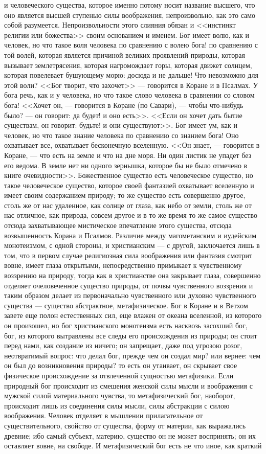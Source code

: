 \documentclass[12pt]{article}
\begin{document}
и человеческого существа, которое именно потому носит название высшего, что оно является высшей ступенью силы воображения, непроизвольно, как это само собой разумеется. Непроизвольности этого слияния обязан и <<инстинкт религии или божества>> своим основанием и именем. Бог имеет волю, как и человек, но что такое воля человека по сравнению с волею бога! по сравнению с той волей, которая является причиной великих проявлений природы, которая вызывает землетрясения, которая нагромождает горы, которая движет солнцем, которая повелевает бушующему морю: досюда и не дальше! Что невозможно для этой воли? <<Бог творит, что захочет>>  --- говорится в Коране и в Псалмах. У бога речь, как и у человека, но что такое слово человека в сравнении со словом бога! <<Хочет он, --- говорится в Коране (по Савари), --- чтобы что-нибудь было? --- он говорит: да будет! и оно есть>>. <<Если он хочет дать бытие существам, он говорит: будьте! и они существуют>>. Бог имеет ум, как и человек, но что такое знание человека по сравнению со знанием бога! Оно охватывает все, охватывает бесконечную вселенную. <<Он знает, --- говорится в Коране, --- что есть на земле и что на дне моря. Ни один листик не упадет без его ведома. В земле нет ни одного зернышка, которое бы не было отмечено в книге очевидности>>. Божественное существо есть человеческое существо, но такое человеческое существо, которое своей фантазией охватывает вселенную и имеет своим содержанием природу; то же существо есть совершенно другое, столь же от нас удаленное, как солнце от глаза, как небо от земли, столь же от нас отличное, как природа, совсем другое и в то же время то же самое существо отсюда захватывающее мистическое впечатление этого существа, отсюда возвышенность Корана и Псалмов. Различие между магометанским и иудейским монотеизмом, с одной стороны, и христианским --- с другой, заключается лишь в том, что в первом случае религиозная сила воображения или фантазия смотрит вовне, имеет глаза открытыми, непосредственно примыкает к чувственному воззрению на природу, тогда как в христианстве она закрывает глаза, совершенно отделяет очеловеченное существо природы, от почвы чувственного воззрения и таким образом делает из первоначально чувственного или духовно чувственного существа --- существо абстрактное, метафизическое. Бог в Коране и в Ветхом завете еще полон естественных сил, еще влажен от океана вселенной, из которого он произошел, но бог христианского монотеизма есть насквозь засохший бог, бог, из которого вытравлены все следы его происхождения из природы; он стоит перед нами, как создание из ничего; он запрещает, даже под угрозою розог, неотвратимый вопрос: что делал бог, прежде чем он создал мир? или вернее: чем он был до возникновения природы? то есть он утаивает, он скрывает свое физическое происхождение за отвлеченной сущностью метафизики. Если природный бог происходит из смешения женской силы мысли и воображения с мужской силой материального чувства, то метафизический бог, наоборот, происходит лишь из соединения силы мысли, силы абстракции с силою воображения. Человек отделяет в мышлении прилагательное от существительного, свойство от существа, форму от материи, как выражались древние; ибо самый субъект, материю, существо он не может воспринять; он их оставляет вовне, на свободе. И метафизический бог есть не что иное, как краткий 
\end{document}
